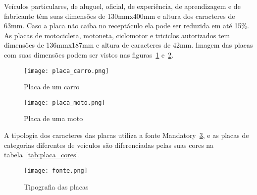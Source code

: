 Veículos particulares, de aluguel, oficial, de experiência, de aprendizagem e de
fabricante têm suas dimensões de 130mmx400mm e altura dos caracteres de 63mm.
Caso a placa não caiba no receptáculo ela pode ser reduzida em até 15\%. As
placas de motocicleta, motoneta, ciclomotor e triciclos autorizados tem
dimensões de 136mmx187mm e altura de caracteres de 42mm. Imagem das placas com
suas dimensões podem ser vistos nas figuras~\ref{fig:placa_carro}
e~\ref{fig:placa_moto}.

\begin{figure}[H]
		\centering
		\texttt{[image: placa\_carro.png]}
		\caption{Placa de um carro}
		\label{fig:placa_carro}
\end{figure}

\begin{figure}[H]
		\centering
		\texttt{[image: placa\_moto.png]}
		\caption{Placa de uma moto}
		\label{fig:placa_moto}
\end{figure}

A tipologia dos caracteres das placas utiliza a fonte
Mandatory~\ref{fig:tipografia}, e as placas de categorias diferentes de veículos
são diferenciadas pelas suas cores na tabela~\ref{tab:placa_cores}.

\begin{figure}[H]
		\centering
		\texttt{[image: fonte.png]}
		\caption{Tipografia das placas}
		\label{fig:tipografia}
\end{figure}

